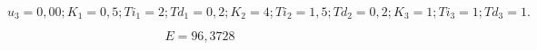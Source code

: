 
%     


\begin{figure}[H]
    \centering
    
    \caption{$u_3 = 0,00; K_1 = 0,5; Ti_1 = 2; Td_1 = 0,2; K_2 = 4; Ti_2 = 1,5; Td_2 = 0,2; K_3 = 1; Ti_3 = 1; Td_3 = 1.$}
\end{figure}

\begin{equation}
    E = 96,3728
\end{equation}

%     


%     

